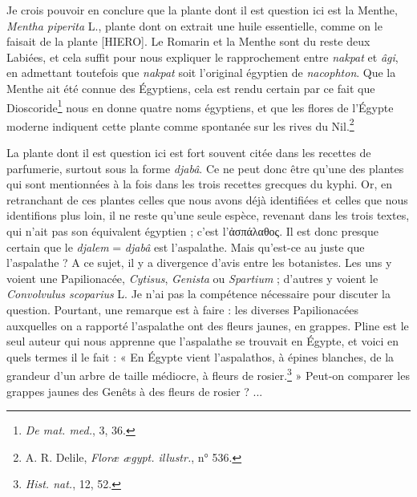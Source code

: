 \documentclass[a4paper, 11pt, oneside]{article}
\begin{document}
Je crois pouvoir en conclure que la plante dont il est question ici est la Menthe, \emph{Mentha piperita} L., plante dont on extrait une huile essentielle, comme on le faisait de la plante [HIERO]. Le Romarin et la Menthe sont du reste deux Labiées, et cela suffit pour nous expliquer le rapprochement entre \emph{nakpat} et \emph{âgi}, en admettant toutefois que \emph{nakpat} soit l'original égyptien de \emph{nacophton}. Que la Menthe ait été connue des Égyptiens, cela est rendu certain par ce fait que Dioscoride\footnote{\emph{De mat. med.}, 3, 36.} nous en donne quatre noms égyptiens, et que les flores de l'Égypte moderne indiquent cette plante comme spontanée sur les rives du Nil.\footnote{A. R. Delile, \emph{Floræ ægypt. illustr.}, n° 536.}


La plante dont il est question ici est fort souvent citée dans les recettes de parfumerie, surtout sous la forme \emph{djabâ}. Ce ne peut donc être qu'une des plantes qui sont mentionnées à la fois dans les trois recettes grecques du kyphi. Or, en retranchant de ces plantes celles que nous avons déjà identifiées et celles que nous identifions plus loin, il ne reste qu'une seule espèce, revenant dans les trois textes, qui n'ait pas son équivalent égyptien ; c'est l'ἀσπάλαθος. Il est donc presque certain que le \emph{djalem} = \emph{djabâ} est l'aspalathe. Mais qu'est-ce au juste que l'aspalathe ? A ce sujet, il y a divergence d'avis entre les botanistes. Les uns y voient une Papilionacée, \emph{Cytisus}, \emph{Genista} ou \emph{Spartium} ; d'autres y voient le \emph{Convolvulus scoparius} L. Je n'ai pas la compétence nécessaire pour discuter la question. Pourtant, une remarque est à faire : les diverses Papilionacées auxquelles on a rapporté l'aspalathe ont des fleurs jaunes, en grappes. Pline est le seul auteur qui nous apprenne que l'aspalathe se trouvait en Égypte, et voici en quels termes il le fait : « En Égypte vient l'aspalathos, à épines blanches, de la grandeur d'un arbre de taille médiocre, à fleurs de rosier.\footnote{\emph{Hist. nat.}, 12, 52.} » Peut-on comparer les grappes jaunes des Genêts à des fleurs de rosier ? ...
\end{document}
